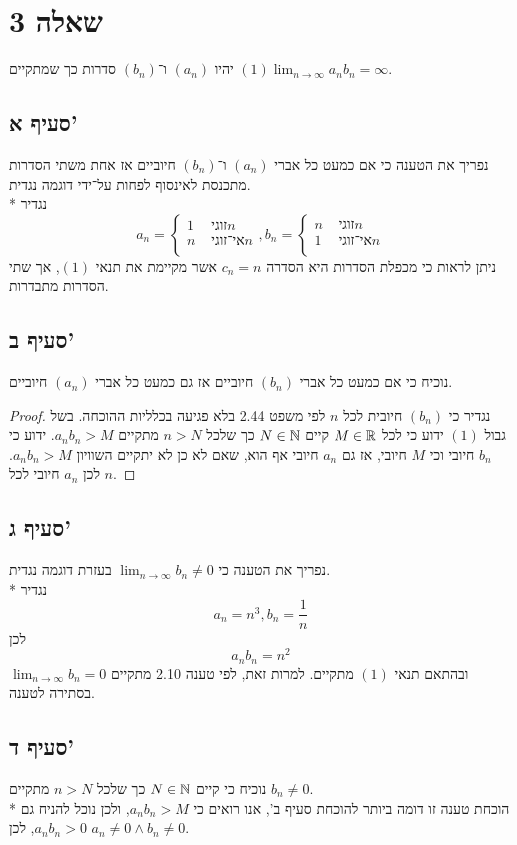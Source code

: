 \section{שאלה 3}
יהיו $(a_n)$ ו־$(b_n)$ סדרות כך שמתקיים $(1) \lim_{n \to \infty} a_n b_n = \infty$.

\subsection{סעיף א'}
נפריך את הטענה כי אם כמעט כל אברי $(a_n)$ ו־$(b_n)$ חיוביים אז אחת משתי הסדרות מתכנסת לאינסוף לפחות על־ידי דוגמה נגדית. \\*
נגדיר
\[
	a_n = \begin{cases}
		1 & \text{ זוגי} n \\
		n & \text{ אי־זוגי} n \\
	\end{cases},
	b_n = \begin{cases}
		n & \text{ זוגי} n \\
		1 & \text{ אי־זוגי} n \\
	\end{cases}
\]
ניתן לראות כי מכפלת הסדרות היא הסדרה $c_n = n$ אשר מקיימת את תנאי $(1)$, אך שתי הסדרות מתבדרות.

\subsection{סעיף ב'}
נוכיח כי אם כמעט כל אברי $(b_n)$ חיוביים אז גם כמעט כל אברי $(a_n)$ חיוביים.
\begin{proof}
	נגדיר כי $(b_n)$ חיובית לכל $n$ לפי משפט 2.44 בלא פגיעה בכלליות ההוכחה.
	בשל גבול $(1)$ ידוע כי לכל $M \in \mathbb{R}$ קיים $N \in \mathbb{N}$ כך שלכל $n > N$ מתקיים $a_n b_n > M$.
	ידוע כי $b_n$ חיובי וכי $M$ חיובי, אז גם $a_n$ חיובי אף הוא, שאם לא כן לא יתקיים השוויון $a_n b_n > M$.
	לכן $a_n$ חיובי לכל $n$.
\end{proof}

\subsection{סעיף ג'}
נפריך את הטענה כי $\lim_{n \to \infty} b_n \ne 0$ בעזרת דוגמה נגדית. \\*
נגדיר
\[
	a_n = n^3,
	b_n = \frac{1}{n}
\]
לכן
\[
	a_n b_n = n^2
\]
ובהתאם תנאי $(1)$ מתקיים. למרות זאת, לפי טענה 2.10 מתקיים $\lim_{n \to \infty} b_n = 0$ בסתירה לטענה.

\subsection{סעיף ד'}
נוכיח כי קיים $N \in \mathbb{N}$ כך שלכל $n > N$ מתקיים $b_n \ne 0$. \\*
הוכחת טענה זו דומה ביותר להוכחת סעיף ב', אנו רואים כי $a_n b_n > M$, ולכן נוכל להניח גם $a_n b_n > 0$, לכן $a_n \ne 0 \land b_n \ne 0$.

